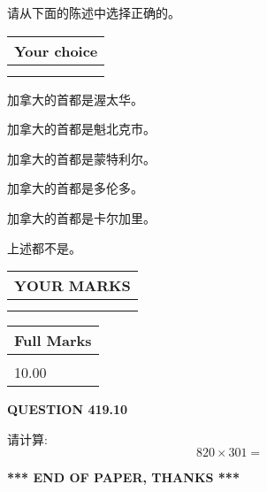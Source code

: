 \documentclass{ctexart}
\begin{document}
  
请从下面的陈述中选择正确的。
  
  
\noindent\hspace{3.0in} \begin{tabular}{|l|}
\hline
Your choice \\
\hline
 \\ 
 \\ 
\hline
\end{tabular}
  
  
 
 
加拿大的首都是渥太华。
 
 
加拿大的首都是魁北克市。
 
 
加拿大的首都是蒙特利尔。
 
 
加拿大的首都是多伦多。
 
 
加拿大的首都是卡尔加里。
 
 
 上述都不是。
 
 
  
\vspace{0.2in}
  
\noindent\begin{tabular}{|l|}
\hline
 YOUR MARKS  \\
\hline
 \\ 
 \\ 
\hline
\end{tabular}
\hspace{0.05in} \begin{tabular}{|l|}
\hline
 Full Marks  \\
\hline
 \\ 
10.00 \\
\hline
\end{tabular}
{\textbf{\Large{QUESTION
419.10 
}}}
  
  
 
请计算:
\begin{equation}
820  \times    %
301 = \nonumber
\end{equation}
 

 

 
   
   
 \vspace{0.2in}
 
   
   
   
   
\vspace{1.0in} 
{\textbf{\large{ *** END OF PAPER, THANKS *** }}} 
   
\end{document}
